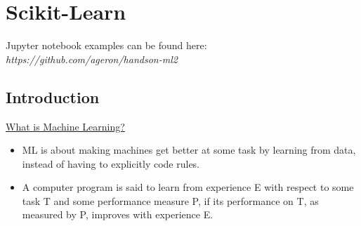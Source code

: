 \section{Scikit-Learn}

Jupyter notebook examples can be found here: \textit{https://github.com/ageron/handson-ml2}\newline

\subsection{Introduction}

\underline{What is Machine Learning?}
\begin{itemize}
\vspace{-4.0mm}
\item
ML is about making machines get better at some task by learning from data,
instead of having to explicitly code rules.
\item
A computer program is said to learn from experience E with respect to some task T and some performance measure P,
if its performance on T, as measured by P, improves with experience E.
\end{itemize}

